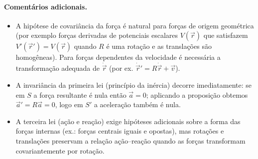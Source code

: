 \documentclass[../../main]{subfiles}
\begin{document}
\paragraph{Comentários adicionais.}
\begin{itemize}
    \item A hipótese de covariância da força é natural para forças de origem
        geométrica (por exemplo forças derivadas de potenciais escalares
            \(V(\vec r)\) que satisfazem \(V'( \vec r') = V(\vec r)\) quando
            \(R\)
        é uma rotação e as translações são homogêneas). Para forças dependentes
        da velocidade é necessária a transformação adequada de \(\dot{\vec r}\)
        (por ex. \(\dot{\vec r}'=R\dot{\vec r}+\vec v\)).
    \item A invariância da primeira lei (princípio da inércia) decorre
        imediatamente: se em \(S\) a força resultante é nula então \( \vec
        a=0\); aplicando a proposição obtemos \(\vec a'=R\vec a=0\), logo em
        \(S'\) a aceleração também é nula.
    \item A terceira lei (ação e reação) exige hipóteses adicionais sobre a
        forma das forças internas (ex.: forças centrais iguais e opostas), mas
        rotações e translações preservam a relação ação–reação quando as forças
        transformam covariantemente por rotação.
\end{itemize}
\end{document}
